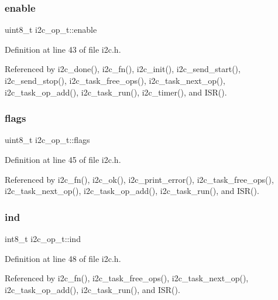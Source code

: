 \subsubsection{\texorpdfstring{enable}{enable}}
{\footnotesize\ttfamily uint8\+\_\+t i2c\+\_\+op\+\_\+t\+::enable}



Definition at line 43 of file i2c.\+h.



Referenced by i2c\+\_\+done(), i2c\+\_\+fn(), i2c\+\_\+init(), i2c\+\_\+send\+\_\+start(), i2c\+\_\+send\+\_\+stop(), i2c\+\_\+task\+\_\+free\+\_\+ops(), i2c\+\_\+task\+\_\+next\+\_\+op(), i2c\+\_\+task\+\_\+op\+\_\+add(), i2c\+\_\+task\+\_\+run(), i2c\+\_\+timer(), and I\+S\+R().

\mbox{\label{structi2c__op__t_a99ce5c1c16cf8a7b8293f5b96ac74c27}} 
\subsubsection{\texorpdfstring{flags}{flags}}
{\footnotesize\ttfamily uint8\+\_\+t i2c\+\_\+op\+\_\+t\+::flags}



Definition at line 45 of file i2c.\+h.



Referenced by i2c\+\_\+fn(), i2c\+\_\+ok(), i2c\+\_\+print\+\_\+error(), i2c\+\_\+task\+\_\+free\+\_\+ops(), i2c\+\_\+task\+\_\+next\+\_\+op(), i2c\+\_\+task\+\_\+op\+\_\+add(), i2c\+\_\+task\+\_\+run(), and I\+S\+R().

\mbox{\label{structi2c__op__t_a628b6ac83f7303b4dab9a9d86b6167a0}} 
\subsubsection{\texorpdfstring{ind}{ind}}
{\footnotesize\ttfamily int8\+\_\+t i2c\+\_\+op\+\_\+t\+::ind}



Definition at line 48 of file i2c.\+h.



Referenced by i2c\+\_\+fn(), i2c\+\_\+task\+\_\+free\+\_\+ops(), i2c\+\_\+task\+\_\+next\+\_\+op(), i2c\+\_\+task\+\_\+op\+\_\+add(), i2c\+\_\+task\+\_\+run(), and I\+S\+R().

